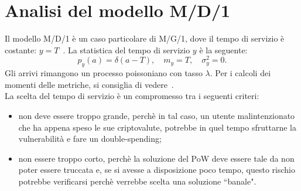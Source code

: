 
\section{Analisi del modello M/D/1}
Il modello M/D/1 \`e un caso particolare di M/G/1, dove il tempo di servizio \`e costante: $y=T$~\cite{libro:tele}.
La statistica del tempo di servizio $y$ \`e la seguente:
\begin{equation}p_y(a)=\delta(a-T), \quad m_y=T, \quad \sigma_y^2=0. \end{equation}
Gli arrivi rimangono un processo poissoniano con tasso $\lambda$.
Per i calcoli dei momenti delle metriche, si consiglia di vedere~\cite[590]{libro:tele}.\\
La scelta del tempo di servizio \`e un compromesso tra i seguenti criteri:
\begin{itemize}
\item non deve essere troppo grande, perch\`e in tal caso, un utente malintenzionato che ha appena speso le sue criptovalute, potrebbe in quel tempo sfruttarne la vulnerabilità e fare un double-spending; 
\item non essere troppo corto, perch\`e la soluzione del PoW deve essere tale da non poter essere truccata e, se si avesse a disposizione poco tempo, questo rischio potrebbe verificarsi perch\`e verrebbe scelta una soluzione ``banale".
\end{itemize}
